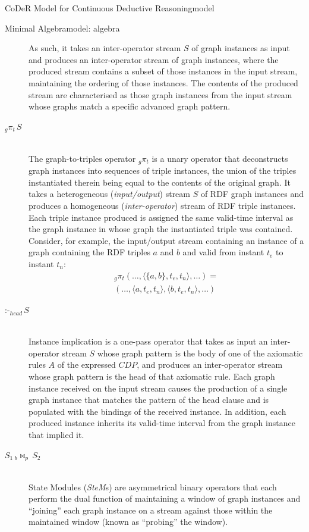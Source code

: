 \begin{nestedsection}{CoDeR Model for Continuous Deductive Reasoning}{model}
\begin{nestedsection}{Minimal Algebra}{model: algebra}
\begin{description}
				As such, it takes an inter-operator stream $S$ of graph instances as input and produces an inter-operator stream of graph instances, where the produced stream contains a subset of those instances in the input stream, maintaining the ordering of those instances.
				The contents of the produced stream are characterised as those graph instances from the input stream whose graphs match a specific advanced graph pattern.
			\item[${{}_g{\pi_t}\,S}$] \hfill \\
				The graph-to-triples operator ${{}_g{\pi_t}}$ is a unary operator that deconstructs graph instances into sequences of triple instances, the union of the triples instantiated therein being equal to the contents of the original graph.
				It takes a heterogeneous (\emph{input/output}) stream $S$ of RDF graph instances and produces a homogeneous (\emph{inter-operator}) stream of RDF triple instances.
				Each triple instance produced is assigned the same valid-time interval as the graph instance in whose graph the instantiated triple was contained.
				Consider, for example, the input/output stream containing an instance of a graph containing the RDF triples $a$ and $b$ and valid from instant $t_e$ to instant $t_n$:
				\begin{multline*}
					{}_g{\pi_t} (\dots,\langle \{a,b\},t_e,t_n \rangle,\dots) = \\
						(\dots,\langle a,t_e,t_n \rangle,\langle b,t_e,t_n \rangle,\dots)
				\end{multline*}
			\item[$\text{:-}_{head}\,S$] \hfill \\
				Instance implication is a one-pass operator that takes as input an inter-operator stream $S$ whose graph pattern is the body of one of the axiomatic rules $A$ of the expressed ${CDP}$, and produces an inter-operator stream whose graph pattern is the head of that axiomatic rule.
				Each graph instance received on the input stream causes the production of a single graph instance that matches the pattern of the head clause and is populated with the bindings of the received instance.
				In addition, each produced instance inherits its valid-time interval from the graph instance that implied it.
			\item[${S_1\,{}_b{\Join_p}\,S_2}$] \hfill \\
				State Modules (\emph{SteM}s) are asymmetrical binary operators that each perform the dual function of maintaining a window of graph instances and ``joining'' each graph instance on a stream against those within the maintained window (known as ``probing'' the window).

\end{description}
\end{nestedsection}
\end{nestedsection}
